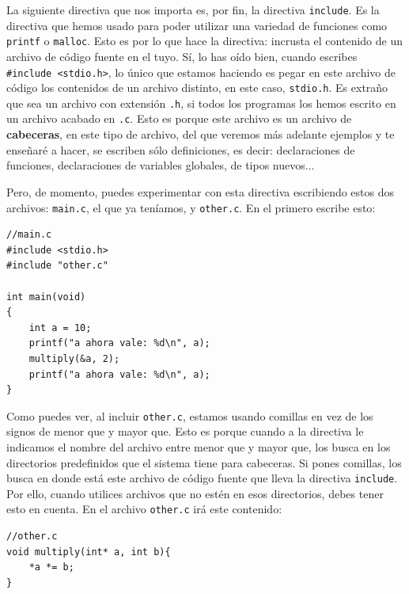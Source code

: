 \documentclass[a4paper]{article}
\begin{document}
La siguiente directiva que nos importa es, por fin, la directiva \verb!include!.
Es la directiva que hemos usado para poder utilizar una variedad de funciones
como \verb"printf" o \verb!malloc!. Esto es por lo que hace la directiva:
incrusta el contenido de un archivo de código fuente en el tuyo. Sí, lo has
oído bien, cuando escribes \verb!#include <stdio.h>!, lo único que estamos
haciendo es pegar en este archivo de código los contenidos de un archivo
distinto, en este caso, \verb!stdio.h!. Es extraño que sea un archivo con
extensión \verb!.h!, si todos los programas los hemos escrito en un archivo
acabado en \verb!.c!. Esto es porque este archivo es un archivo de
\textbf{cabeceras}, en este tipo de archivo, del que veremos más adelante
ejemplos y te enseñaré a hacer, se escriben sólo definiciones, es decir:
declaraciones de funciones, declaraciones de variables globales, de tipos
nuevos...

Pero, de momento, puedes experimentar con esta directiva escribiendo estos
dos archivos: \verb!main.c!, el que ya teníamos, y \verb!other.c!. En el primero
escribe esto:

\noindent
\begin{minipage}[H]{\linewidth}
\mbox{}
\begin{lstlisting}[style=C,
caption={Ejemplo de directiva \texttt{include}, archivo principal},
label={lst:include1}]
//main.c
#include <stdio.h>
#include "other.c"

int main(void)
{
    int a = 10;
    printf("a ahora vale: %d\n", a);
    multiply(&a, 2);
    printf("a ahora vale: %d\n", a);
}
\end{lstlisting}
\end{minipage}

Como puedes ver, al incluir \verb!other.c!, estamos usando comillas en vez de
los signos de menor que y mayor que. Esto es porque cuando a la directiva le
indicamos el nombre del archivo entre menor que y mayor que, los busca en los
directorios predefinidos que el sistema tiene para cabeceras. Si pones comillas,
los busca en donde está este archivo de código fuente que lleva la directiva
\verb!include!. Por ello, cuando utilices archivos que no estén en esos
directorios, debes tener esto en cuenta. En el archivo \verb!other.c! irá este
contenido:

\noindent
\begin{minipage}[H]{\linewidth}
\mbox{}
\begin{lstlisting}[style=C,
caption={Ejemplo de directiva \texttt{include}, archivo incluido},
label={lst:include2}]
//other.c
void multiply(int* a, int b){
    *a *= b;
}
\end{lstlisting}
\end{minipage}
\end{document}
